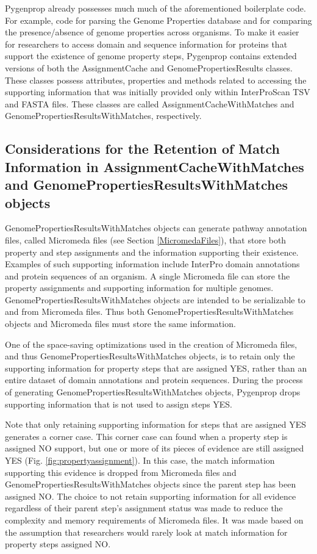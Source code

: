 Pygenprop already possesses much much of the aforementioned boilerplate code. For example, code for parsing the Genome Properties database and for comparing the presence/absence of genome properties across organisms. To make it easier for researchers to access domain and sequence information for proteins that support the existence of genome property steps, Pygenprop contains extended versions of both the AssignmentCache and GenomePropertiesResults classes. These classes possess attributes, properties and methods related to accessing the supporting information that was initially provided only within InterProScan TSV and FASTA files. These classes are called AssignmentCacheWithMatches and GenomePropertiesResultsWithMatches, respectively.

\subsection{Considerations for the Retention of Match Information in AssignmentCacheWithMatches and GenomePropertiesResultsWithMatches objects} \label{MatchConsiderations}

GenomePropertiesResultsWithMatches objects can generate pathway annotation files, called Micromeda files (see Section \ref{MicromedaFiles}), that store both property and step assignments and the information supporting their existence. Examples of such supporting information include InterPro domain annotations and protein sequences of an organism. A single Micromeda file can store the property assignments and supporting information for multiple genomes. GenomePropertiesResultsWithMatches objects are intended to be serializable to and from Micromeda files. Thus both GenomePropertiesResultsWithMatches objects and Micromeda files must store the same information.

One of the space-saving optimizations used in the creation of Micromeda files, and thus GenomePropertiesResultsWithMatches objects, is to retain only the supporting information for property steps that are assigned YES, rather than an entire dataset of domain annotations and protein sequences. During the process of generating GenomePropertiesResultsWithMatches objects, Pygenprop drops supporting information that is not used to assign steps YES.

Note that only retaining supporting information for steps that are assigned YES generates a corner case. This corner case can found when a property step is assigned NO support, but one or more of its pieces of evidence are still assigned YES (Fig. \ref{fig:propertyassignment}). In this case, the match information supporting this evidence is dropped from Micromeda files and GenomePropertiesResultsWithMatches objects since the parent step has been assigned NO. The choice to not retain supporting information for all evidence regardless of their parent step's assignment status was made to reduce the complexity and memory requirements of Micromeda files. It was made based on the assumption that researchers would rarely look at match information for property steps assigned NO.

